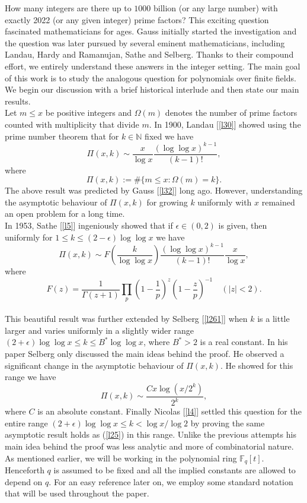 \documentclass[12pt]{amsart}
\numberwithin{equation}{section}
\theoremstyle{remark}
\theoremstyle{remark}
\theoremstyle{definition}
\begin{document}
How many integers are there up to $1000$ billion (or any large number) with exactly 2022 (or any given integer) prime factors? This exciting question fascinated mathematicians for ages. Gauss initially started the investigation and the question was later pursued by several eminent mathematicians, including Landau, Hardy and Ramanujan, Sathe and Selberg. Thanks to their compound effort, we entirely understand these answers in the integer setting. The main goal of this work is to study the analogous question for polynomials over finite fields. We begin our discussion with a brief historical interlude and then state our main results.\\
Let $m\leqslant x$ be positive integers and $\Omega(m)$ denotes the number of prime factors counted with multiplicity that divide $m$. In 1900, Landau [\ref{l30}] showed using the prime number theorem that for $k\in\mathbb{N}$ fixed we have
$$\Pi(x,k)\sim \dfrac{x}{\log x} \dfrac{(\log\log x)^{k-1}}{(k-1)!},$$
where
\[\Pi(x,k):= \#\bigg \{m\leqslant x:\Omega(m)=k \bigg \}.\]
The above result was predicted by Gauss [\ref{l32}] long ago. However, understanding the asymptotic behaviour of $\Pi(x,k)$ for growing $k$ uniformly with $x$ remained an open problem for a long time.\\
In 1953, Sathe [\ref{l5}] ingeniously showed that if $\epsilon\in(0,2)$ is given, then uniformly for $1\leqslant k\leqslant (2-\epsilon)\log\log x$ we have
\begin{equation}\label{l260}
\Pi(x,k)\sim F\left( \dfrac{k}{\log\log x} \right)\dfrac{{(\log\log x)}^{k-1}}{(k-1)!}\dfrac{x}{\log x},
\end{equation}
where
\[
F(z)=\dfrac{1}{\Gamma(z+1)}\displaystyle\prod\limits_{p} \left(1-\dfrac{1}{p} \right)^z\left(1-\dfrac{z}{p} \right)^{-1}\quad(|z|<2).\]
\\This beautiful result was further extended by Selberg [\ref{l261}] when $k$ is a little larger and varies uniformly in a slightly wider range $(2+\epsilon)\log\log x\leqslant k \leqslant B^{*}\log\log x$, where $B^{*}>2$ is a real constant. In his paper Selberg only discussed the main ideas behind the proof. He observed a significant change in the asymptotic behaviour of $\Pi(x,k)$. He showed for this range we have
\begin{equation}\label{l25}
\Pi(x,k)\sim \dfrac{Cx\log (x/2^k)}{2^k},
\end{equation}
where $C$ is an absolute constant. 
Finally Nicolas [\ref{l4}] settled this question for the entire range $(2+\epsilon)\log\log x\leqslant k< \log x/\log 2$ by proving the same asymptotic result holds as (\ref{l25}) in this range. Unlike the previous attempts his main idea behind the proof was less analytic and more of combinatorial nature.\\
As mentioned earlier, we will be working in the polynomial ring  $\mathbb{F}_q[t]$. Henceforth $q$ is assumed to be fixed and all the implied constants are allowed to depend on $q$. For an easy reference later on, we employ some standard notation that will be used throughout the paper.\\
\end{document}
